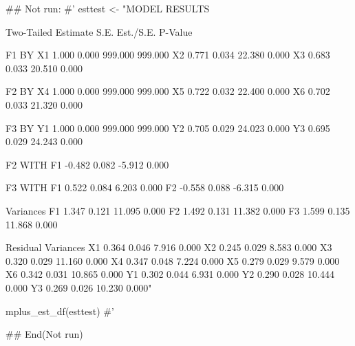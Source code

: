 \documentclass[a4paper]{book}
\begin{document}
\begin{Examples}
\begin{ExampleCode}


\#\# Not run: 
#'
esttest <- "MODEL RESULTS

                                                    Two-Tailed
                    Estimate       S.E.  Est./S.E.    P-Value

 F1       BY
    X1                 1.000      0.000    999.000    999.000
    X2                 0.771      0.034     22.380      0.000
    X3                 0.683      0.033     20.510      0.000

 F2       BY
    X4                 1.000      0.000    999.000    999.000
    X5                 0.722      0.032     22.400      0.000
    X6                 0.702      0.033     21.320      0.000

 F3       BY
    Y1                 1.000      0.000    999.000    999.000
    Y2                 0.705      0.029     24.023      0.000
    Y3                 0.695      0.029     24.243      0.000

 F2       WITH
    F1                -0.482      0.082     -5.912      0.000

 F3       WITH
    F1                 0.522      0.084      6.203      0.000
    F2                -0.558      0.088     -6.315      0.000

 Variances
    F1                 1.347      0.121     11.095      0.000
    F2                 1.492      0.131     11.382      0.000
    F3                 1.599      0.135     11.868      0.000

 Residual Variances
    X1                 0.364      0.046      7.916      0.000
    X2                 0.245      0.029      8.583      0.000
    X3                 0.320      0.029     11.160      0.000
    X4                 0.347      0.048      7.224      0.000
    X5                 0.279      0.029      9.579      0.000
    X6                 0.342      0.031     10.865      0.000
    Y1                 0.302      0.044      6.931      0.000
    Y2                 0.290      0.028     10.444      0.000
    Y3                 0.269      0.026     10.230      0.000"

mplus_est_df(esttest)
#'

## End(Not run)

\end{ExampleCode}
\end{Examples}
\end{document}
